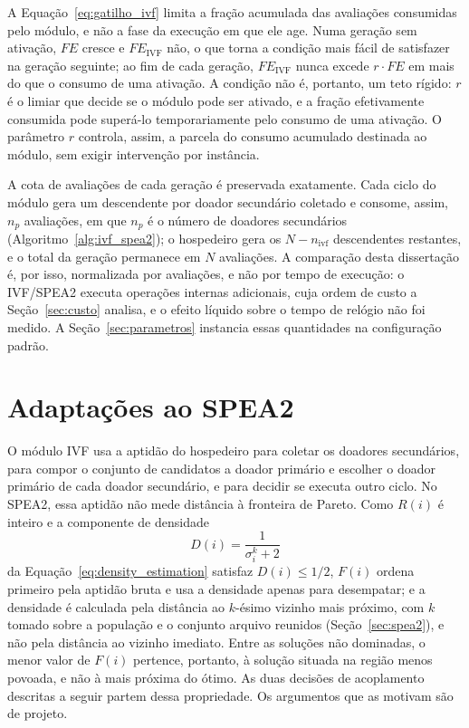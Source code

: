 A Equação~\ref{eq:gatilho_ivf} limita a fração acumulada das avaliações consumidas pelo módulo, e não a fase da execução em que ele age. Numa geração sem ativação, $FE$ cresce e $FE_{\text{IVF}}$ não, o que torna a condição mais fácil de satisfazer na geração seguinte; ao fim de cada geração, $FE_{\text{IVF}}$ nunca excede $r \cdot FE$ em mais do que o consumo de uma ativação. A condição não é, portanto, um teto rígido: $r$ é o limiar que decide se o módulo pode ser ativado, e a fração efetivamente consumida pode superá-lo temporariamente pelo consumo de uma ativação. O parâmetro $r$ controla, assim, a parcela do consumo acumulado destinada ao módulo, sem exigir intervenção por instância.

A cota de avaliações de cada geração é preservada exatamente. Cada ciclo do módulo gera um descendente por doador secundário coletado e consome, assim, $n_p$ avaliações, em que $n_p$ é o número de doadores secundários (Algoritmo~\ref{alg:ivf_spea2}); o hospedeiro gera os $N - n_{\text{ivf}}$ descendentes restantes, e o total da geração permanece em $N$ avaliações. A comparação desta dissertação é, por isso, normalizada por avaliações, e não por tempo de execução: o IVF/SPEA2 executa operações internas adicionais, cuja ordem de custo a Seção~\ref{sec:custo} analisa, e o efeito líquido sobre o tempo de relógio não foi medido. A Seção~\ref{sec:parametros} instancia essas quantidades na configuração padrão.

\section{Adaptações ao SPEA2}
\label{sec:adaptacoes}

O módulo IVF usa a aptidão do hospedeiro para coletar os doadores secundários, para compor o conjunto de candidatos a doador primário e escolher o doador primário de cada doador secundário, e para decidir se executa outro ciclo. No SPEA2, essa aptidão não mede distância à fronteira de Pareto. Como $R(i)$ é inteiro e a componente de densidade
\begin{equation*}
D(i) = \frac{1}{\sigma_i^k + 2}
\end{equation*}
da Equação~\ref{eq:density_estimation} satisfaz $D(i) \leq 1/2$, $F(i)$ ordena primeiro pela aptidão bruta e usa a densidade apenas para desempatar; e a densidade é calculada pela distância ao $k$-ésimo vizinho mais próximo, com $k$ tomado sobre a população e o conjunto arquivo reunidos (Seção~\ref{sec:spea2}), e não pela distância ao vizinho imediato. Entre as soluções não dominadas, o menor valor de $F(i)$ pertence, portanto, à solução situada na região menos povoada, e não à mais próxima do ótimo. As duas decisões de acoplamento descritas a seguir partem dessa propriedade. Os argumentos que as motivam são de projeto.

